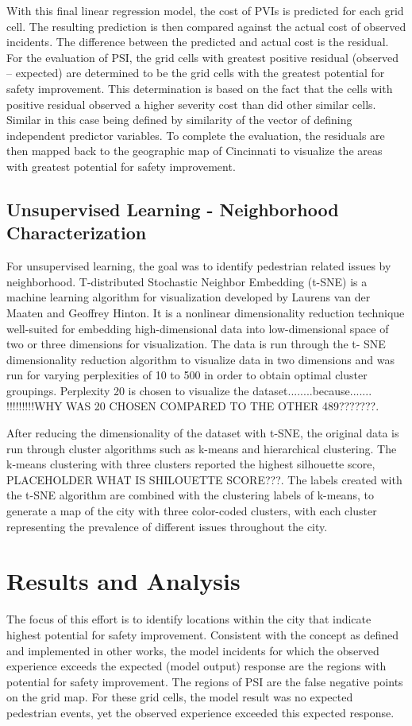 \documentclass{llncs}
\begin{document}
With this final linear regression model, the cost of PVIs is predicted for each grid cell. The resulting prediction is then compared against the actual cost of observed incidents. The difference between the predicted and actual cost is the residual. For the evaluation of PSI, the grid cells with greatest positive residual (observed – expected) are determined to be the grid cells with the greatest potential for safety improvement. This determination is based on the fact that the cells with positive residual observed a higher severity cost than did other similar cells. Similar in this case being defined by similarity of the vector of defining independent predictor variables. To complete the evaluation, the residuals are then mapped back to the geographic map of Cincinnati to visualize the areas with greatest potential for safety improvement.

\subsection{Unsupervised Learning - Neighborhood Characterization}
For unsupervised learning, the goal was to identify pedestrian related issues by neighborhood. T-distributed Stochastic Neighbor Embedding (t-SNE) \cite{tsne} is a machine learning algorithm for visualization developed by Laurens van der Maaten and Geoffrey Hinton. It is a nonlinear dimensionality reduction technique well-suited for embedding high-dimensional data into low-dimensional space of two or three dimensions  for visualization. The data is run through the t- SNE dimensionality reduction algorithm to visualize data in two dimensions and was run for varying perplexities of 10 to 500 in order to obtain optimal cluster groupings. Perplexity 20 is chosen to visualize the dataset........because....... !!!!!!!!!WHY WAS 20 CHOSEN COMPARED TO THE OTHER 489???????.

After reducing the dimensionality of the dataset with t-SNE, the original data is run through cluster algorithms such as k-means and hierarchical clustering. The k-means clustering with three clusters reported the highest silhouette score, PLACEHOLDER WHAT IS SHILOUETTE SCORE???. The labels created with the t-SNE algorithm are combined with the clustering labels of k-means, to generate a map of the city with three color-coded clusters, with each cluster representing the prevalence of different issues throughout the city. 

%
\section{Results and Analysis}
%
The focus of this effort is to identify locations within the city that indicate highest potential for safety improvement. Consistent with the concept as defined and implemented in other works, the model incidents for which the observed experience exceeds the expected (model output) response are the regions with potential for safety improvement. The regions of PSI are the false negative points on the grid map. For these grid cells, the model result was no expected pedestrian events, yet the observed experience exceeded this expected response.
\end{document}
